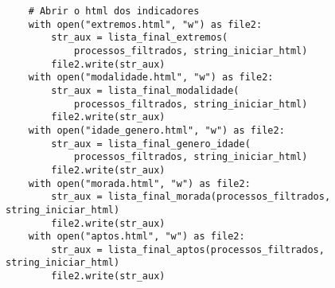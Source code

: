 \documentclass[11pt,a4paper]{report}%
\begin{document}
\begin{verbatim}
    # Abrir o html dos indicadores
    with open("extremos.html", "w") as file2:
        str_aux = lista_final_extremos(
            processos_filtrados, string_iniciar_html)
        file2.write(str_aux)
    with open("modalidade.html", "w") as file2:
        str_aux = lista_final_modalidade(
            processos_filtrados, string_iniciar_html)
        file2.write(str_aux)
    with open("idade_genero.html", "w") as file2:
        str_aux = lista_final_genero_idade(
            processos_filtrados, string_iniciar_html)
        file2.write(str_aux)
    with open("morada.html", "w") as file2:
        str_aux = lista_final_morada(processos_filtrados, string_iniciar_html)
        file2.write(str_aux)
    with open("aptos.html", "w") as file2:
        str_aux = lista_final_aptos(processos_filtrados, string_iniciar_html)
        file2.write(str_aux)

\end{verbatim}
\end{document}
